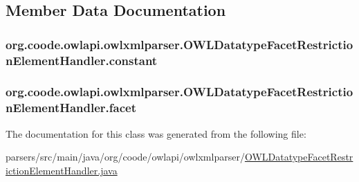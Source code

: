 \subsection{Member Data Documentation}
\hypertarget{classorg_1_1coode_1_1owlapi_1_1owlxmlparser_1_1_o_w_l_datatype_facet_restriction_element_handler_a9baf78c10797d35783aeae3b53fa47d1}{
\subsubsection[{constant}]{ org.\-coode.\-owlapi.\-owlxmlparser.\-O\-W\-L\-Datatype\-Facet\-Restriction\-Element\-Handler.\-constant\hspace{0.3cm}{\ttfamily [private]}}}\label{classorg_1_1coode_1_1owlapi_1_1owlxmlparser_1_1_o_w_l_datatype_facet_restriction_element_handler_a9baf78c10797d35783aeae3b53fa47d1}
\hypertarget{classorg_1_1coode_1_1owlapi_1_1owlxmlparser_1_1_o_w_l_datatype_facet_restriction_element_handler_a96127c4820c2a89f48ab6dcc74f73098}{
\subsubsection[{facet}]{ org.\-coode.\-owlapi.\-owlxmlparser.\-O\-W\-L\-Datatype\-Facet\-Restriction\-Element\-Handler.\-facet\hspace{0.3cm}{\ttfamily [private]}}}\label{classorg_1_1coode_1_1owlapi_1_1owlxmlparser_1_1_o_w_l_datatype_facet_restriction_element_handler_a96127c4820c2a89f48ab6dcc74f73098}


The documentation for this class was generated from the following file\-:\begin{DoxyCompactItemize}
\item 
parsers/src/main/java/org/coode/owlapi/owlxmlparser/\hyperlink{_o_w_l_datatype_facet_restriction_element_handler_8java}{O\-W\-L\-Datatype\-Facet\-Restriction\-Element\-Handler.\-java}\end{DoxyCompactItemize}
